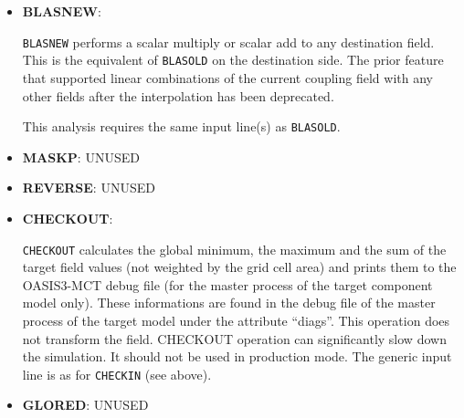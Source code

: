 \begin{itemize}
%
%

\item {\bf BLASNEW}:
 
  {\tt BLASNEW} performs a scalar multiply or scalar add to any
  destination field.  This is the equivalent of {\tt BLASOLD} on the
  destination side.  The prior feature that supported linear
  combinations of the current coupling field with any other fields
  after the interpolation has been deprecated.

  This analysis requires the same input line(s) as {\tt BLASOLD}.

\item {\bf MASKP}: UNUSED

\item {\bf REVERSE}: UNUSED

\item {\bf CHECKOUT}:

  {\tt CHECKOUT} calculates the global minimum, the maximum and the
  sum of the target field values (not weighted by the grid cell area)
  and prints them to the OASIS3-MCT debug file (for the master process
  of the target component model only). These informations are found in 
  the debug file of the master process of the target model under the 
  attribute ``diags''. This operation does not
  transform the field. CHECKOUT operation can significantly slow down the simulation.
  It should not be used in production mode.
  The generic input line is as for {\tt CHECKIN} (see above).

\item {\bf GLORED}: UNUSED

\end{itemize}


